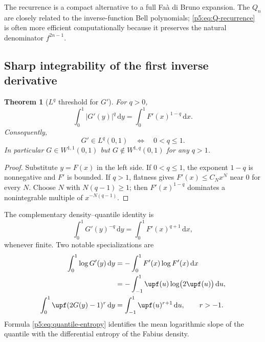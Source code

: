\documentclass[11pt,oneside]{article}
\newtheorem{theorem}{Theorem}[section]
\theoremstyle{definition}
\theoremstyle{remark}
\newcommand{\dd}{\,\mathrm d}
\newcommand{\1}{\mathbf 1}
\begin{document}
The recurrence is a compact alternative to a full Fa\`a di Bruno expansion.  The $Q_n$ are closely related to the inverse-function Bell polynomials; \eqref{p5:eq:Q-recurrence} is often more efficient computationally because it preserves the natural denominator $f^{2n-1}$.

\subsection{Sharp integrability of the first inverse derivative}

\begin{theorem}[$L^q$ threshold for $G'$]\label{p5:thm:Gprime-Lq}
For $q>0$,
\begin{equation}\label{p5:eq:Gprime-Lq-change}
 \int_0^1|G'(y)|^q\dd y
 =\int_0^1F'(x)^{1-q}\dd x.
\end{equation}
Consequently,
\begin{equation}\label{p5:eq:Gprime-Lq-threshold}
 G'\in L^q(0,1)
 \quad\Longleftrightarrow\quad 0<q\le1.
\end{equation}
In particular $G\in W^{1,1}(0,1)$ but $G\notin W^{1,q}(0,1)$ for any $q>1$.
\end{theorem}

\begin{proof}
Substitute $y=F(x)$ in the left side.  If $0<q\le1$, the exponent $1-q$ is nonnegative and $F'$ is bounded.  If $q>1$, flatness gives $F'(x)\le C_Nx^N$ near $0$ for every $N$.  Choose $N$ with $N(q-1)\ge1$; then $F'(x)^{1-q}$ dominates a nonintegrable multiple of $x^{-N(q-1)}$.
\end{proof}

The complementary density--quantile identity is
\begin{equation}\label{p5:eq:inverse-density-power}
 \int_0^1G'(y)^{-q}\dd y
 =\int_0^1F'(x)^{q+1}\dd x,
\end{equation}
whenever finite.  Two notable specializations are
\begin{align}
 \int_0^1\log G'(y)\dd y
 &=-\int_0^1F'(x)\log F'(x)\dd x\notag\\
 &=-\int_{-1}^{1}\upf(u)\log\bigl(2\upf(u)\bigr)\dd u,
 \label{p5:eq:quantile-entropy}\\
 \int_0^1\upf(2G(y)-1)^r\dd y
 &=\int_{-1}^{1}\upf(u)^{r+1}\dd u,
 \qquad r>-1.\label{p5:eq:inverse-up-power}
\end{align}
Formula \eqref{p5:eq:quantile-entropy} identifies the mean logarithmic slope of the quantile with the differential entropy of the Fabius density.
\end{document}
